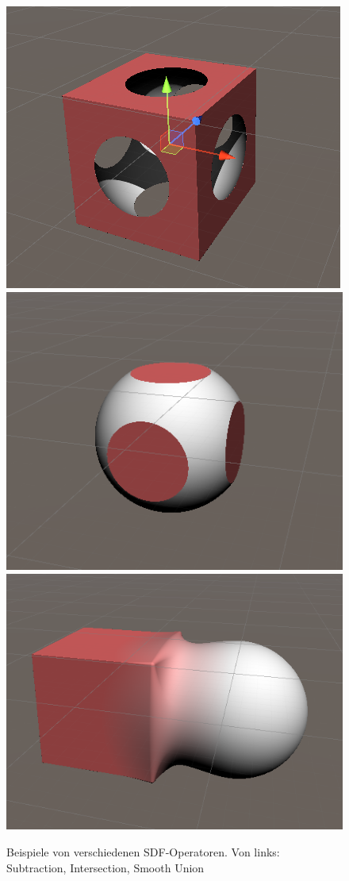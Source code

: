 \begin{figure}[h]
	\centering
	\includegraphics[height=0.15\textheight]{Grafiken/Basics/Volume/sdf_cut.png}
	\includegraphics[height=0.15\textheight]{Grafiken/Basics/Volume/sdf_mask.png}
	\includegraphics[height=0.15\textheight]{Grafiken/Basics/Volume/sdf_union.png}
	\begin{footnotesize}
		\caption{Beispiele von verschiedenen SDF-Operatoren.
			Von links: Subtraction, Intersection, Smooth Union}
		\label{fig:sdfOperators}
	\end{footnotesize}
\end{figure}
